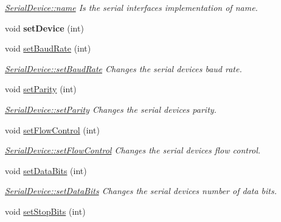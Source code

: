 \begin{DoxyCompactItemize}
\begin{DoxyCompactList}\small\item\em \hyperlink{class_serial_device_a97092ec9379ed561866dad21475ea331}{Serial\+Device\+::name} Is the serial interface\textquotesingle{}s implementation of name. \end{DoxyCompactList}\item 
\hypertarget{class_serial_device_a38f5d9bc555bb1df0a4c8413e494d4b3}{}\label{class_serial_device_a38f5d9bc555bb1df0a4c8413e494d4b3} 
void {\bfseries set\+Device} (int)
\item 
void \hyperlink{class_serial_device_af06c6a34b54819e71186243a38606280}{set\+Baud\+Rate} (int)
\begin{DoxyCompactList}\small\item\em \hyperlink{class_serial_device_af06c6a34b54819e71186243a38606280}{Serial\+Device\+::set\+Baud\+Rate} Changes the serial device\textquotesingle{}s baud rate. \end{DoxyCompactList}\item 
void \hyperlink{class_serial_device_a91e293977d5401ededf350e19846b5a1}{set\+Parity} (int)
\begin{DoxyCompactList}\small\item\em \hyperlink{class_serial_device_a91e293977d5401ededf350e19846b5a1}{Serial\+Device\+::set\+Parity} Changes the serial device\textquotesingle{}s parity. \end{DoxyCompactList}\item 
void \hyperlink{class_serial_device_a74968289347c6ede64587287bb0cf699}{set\+Flow\+Control} (int)
\begin{DoxyCompactList}\small\item\em \hyperlink{class_serial_device_a74968289347c6ede64587287bb0cf699}{Serial\+Device\+::set\+Flow\+Control} Changes the serial device\textquotesingle{}s flow control. \end{DoxyCompactList}\item 
void \hyperlink{class_serial_device_ad0ddca3e77e1d1d4df7c68e83f1ecd91}{set\+Data\+Bits} (int)
\begin{DoxyCompactList}\small\item\em \hyperlink{class_serial_device_ad0ddca3e77e1d1d4df7c68e83f1ecd91}{Serial\+Device\+::set\+Data\+Bits} Changes the serial device\textquotesingle{}s number of data bits. \end{DoxyCompactList}\item 
void \hyperlink{class_serial_device_a95b44d8167ae0a6a025ba9c4f2d5ee47}{set\+Stop\+Bits} (int)

\end{DoxyCompactItemize}
